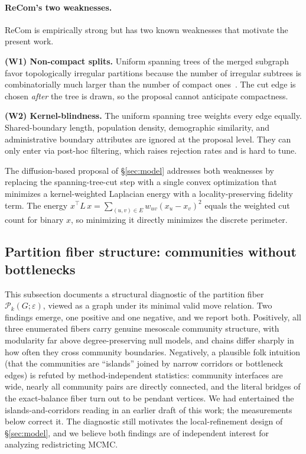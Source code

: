 \documentclass[11pt]{article}
\begin{document}
\paragraph{ReCom's two weaknesses.}\label{sec:background-weakness}
ReCom is empirically strong but has two known weaknesses that motivate
the present work.

\textbf{(W1) Non-compact splits.} Uniform spanning trees of the
merged subgraph favor topologically irregular partitions because the
number of irregular subtrees is combinatorially much larger than the
number of compact ones~\cite{deford2021recombination,deford2019total}.
The cut edge is chosen \emph{after} the tree is drawn, so the
proposal cannot anticipate compactness.

\textbf{(W2) Kernel-blindness.} The uniform spanning tree weights
every edge equally. Shared-boundary length, population density,
demographic similarity, and administrative boundary attributes are
ignored at the proposal level. They can only enter via post-hoc
filtering, which raises rejection rates and is hard to tune.

The diffusion-based proposal of \S\ref{sec:model} addresses both
weaknesses by replacing the spanning-tree-cut step with a single
convex optimization that minimizes a kernel-weighted Laplacian energy
with a locality-preserving fidelity term. The energy
$x^\top L\, x = \sum_{(u,v) \in E} w_{uv} (x_u - x_v)^2$ equals the
weighted cut count for binary $x$, so minimizing it directly minimizes
the discrete perimeter.

\subsection{Partition fiber structure: communities without bottlenecks}\label{sec:fiber-corridors}

This subsection documents a structural diagnostic of the partition fiber
$\mathcal{P}_k(G; \varepsilon)$, viewed as a graph under its minimal
valid move relation. Two findings emerge, one positive and one
negative, and we report both. Positively, all three enumerated fibers
carry genuine mesoscale community structure, with modularity far above
degree-preserving null models, and chains differ sharply in how often
they cross community boundaries. Negatively, a plausible folk
intuition (that the communities are ``islands'' joined by narrow
corridors or bottleneck edges) is refuted by method-independent
statistics: community interfaces are wide, nearly all community pairs
are directly connected, and the literal bridges of the exact-balance
fiber turn out to be pendant vertices. We had entertained the
islands-and-corridors reading in an earlier draft of this work; the
measurements below correct it. The diagnostic still motivates the
local-refinement design of \S\ref{sec:model}, and we believe both
findings are of independent interest for analyzing redistricting
MCMC.
\end{document}
